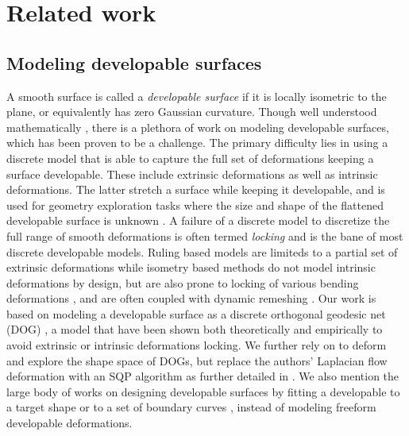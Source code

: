 \section{Related work}
\subsection{Modeling developable surfaces}
A smooth surface is called a \textit{developable surface} if it is locally isometric to the plane, or equivalently has zero Gaussian curvature. Though well understood mathematically \cite{do_carmo,spivak,computational_line}, there is a plethora of work on modeling developable surfaces, which has been proven to be a challenge. The primary difficulty lies in using a discrete model that is able to capture the full set of deformations keeping a surface developable. These include extrinsic deformations as well as intrinsic deformations. The latter stretch a surface while keeping it developable, and is used for geometry exploration tasks where the size and shape of the flattened developable surface is unknown \cite{conical,pottmann_new,rabi2018shape}. A failure of a discrete model to discretize the full range of smooth deformations is often termed \textit{locking} \cite{solomon,locking1} and is the bane of most discrete developable models. Ruling based models \cite{conical,curved_folding_kilian,pottmann_new,stein_dev,solomon} are limiteds to a partial set of extrinsic deformations while isometry based methods \cite{grin_shells,shells, goldenthal2007efficient,froh_botsch} do not model intrinsic deformations by design, but are also prone to locking of various bending deformations \cite{locking1,locking2}, and are often coupled with dynamic remeshing \cite{narain2012adaptive,StringActuated:2017,Narain,SchreckEG2017}.  Our work is based on modeling a developable surface as a discrete orthogonal geodesic net (DOG) \cite{rabi18}, a model that have been shown both theoretically and empirically to avoid extrinsic or intrinsic deformations locking. We further rely on \cite{rabi2018shape} to deform and explore the shape space of DOGs, but replace the authors' Laplacian flow deformation with an SQP algorithm as further detailed in . We also mention the large body of works on designing developable surfaces by fitting a developable to a target shape \cite{pottmann_approx,pottmann_new,stein_dev} or to a set of boundary curves \cite{sheffer,Frey1,Frey2,bo2019multi}, instead of modeling freeform developable deformations.

